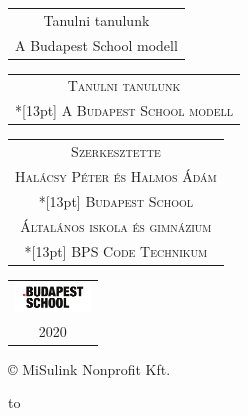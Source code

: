 \thispagestyle{empty}
\vspace*{24mm}
\begin{center}
  \scshape
  \begin{tabular}{c}
    Tanulni tanulunk\\
    A Budapest School modell
  \end{tabular}
\end{center}
\clearpage
\thispagestyle{empty}
\vspace*{24mm}
\begingroup
  \leading{10.8pt}
  \submainfont\par\noindent
\endgroup
\clearpage
\thispagestyle{empty}
\vspace*{24mm}
\begin{center}
  \begin{tabular}{c}
    \Large \scshape Tanulni tanulunk\\*[13pt]
    \Large \scshape A Budapest School modell
  \end{tabular}
  \par\vspace*{48pt}
  \begin{tabular}{c}
    \textsc{\large Szerkesztette}\\
    \textsc{\large Halácsy Péter és Halmos Ádám}\\*[13pt]
    \textsc{Budapest School}\\
    \textsc{Általános iskola és gimnázium}\\*[13pt]
    \textsc{BPS Code Technikum}\\
  \end{tabular}
\end{center}
\vfill
\begin{center}
  \begin{tabular}{c}
    \includegraphics[width=2cm]{logo}\\
    2020\\
  \end{tabular}
\end{center}
\clearpage
\thispagestyle{empty}
\vspace*{24mm}
\begingroup
  \submainfont
  \parindent=0pt
   © MiSulink Nonprofit Kft.
\endgroup

\vspace*{\baselineskip}
\hbox to
